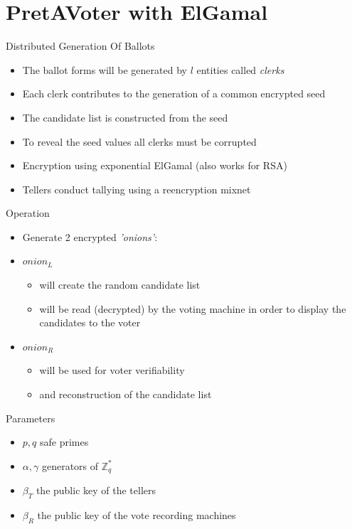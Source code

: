 \documentclass{beamer}
\begin{document}
\section*{PretAVoter with ElGamal}

\begin{frame}[allowframebreaks]{Distributed Generation Of Ballots}

\begin{itemize}
\item The ballot forms will be generated by $l$ entities called \textit{clerks}
\item Each clerk contributes to the generation of a common encrypted seed
\item The candidate list is constructed from the seed
\item To reveal the seed values all clerks must be corrupted
\item Encryption using exponential ElGamal (also works for RSA)
\item Tellers conduct tallying using a reencryption mixnet
\end{itemize}

\begin{block}{Operation}
\begin{itemize}
\item Generate 2 encrypted \textit{'onions'}:

\item $onion_L$ 
\begin{itemize}
\item will create the random candidate list
\item will be read (decrypted) by the voting machine in order to display the candidates to the voter
\end{itemize}

\item $onion_R$ 
\begin{itemize}
\item will be used for voter verifiability
\item and reconstruction of the candidate list
\end{itemize}

\end{itemize}
\end{block}

\begin{block}{Parameters}
\begin{itemize}
\item $p,q$ safe primes
\item $\alpha, \gamma$ generators of $\mathbb{Z}_q^*$
\item $\beta_T$ the public key of the tellers
\item $\beta_R$ the public key of the vote recording machines
\end{itemize}
\end{block}


\end{frame}
\end{document}
